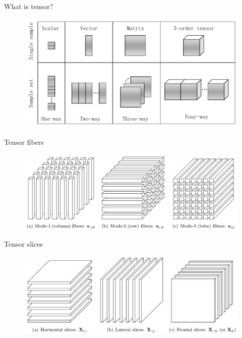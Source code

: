 \documentclass[t, 10pt, handout, aspectratio=169]{beamer}
\begin{document}
\begin{frame}{What is tensor?}
\begin{figure}
	\centering  
	\includegraphics[height=0.7\paperheight]{figs/tensor_sample}
	\label{fig:tensor_sample}
\end{figure}
\end{frame}

\begin{frame}{Tensor fibers}
\begin{figure}
	\centering  
	\includegraphics[width=\linewidth]{figs/tensor_fibers}
	\label{fig:tensor_fibers}
\end{figure}
\end{frame}

\begin{frame}{Tensor slices}
\begin{figure}
	\centering  
	\includegraphics[width=\linewidth]{figs/tensor_slices}
	\label{fig:tensor_slices}
\end{figure}
\end{frame}
\end{document}
